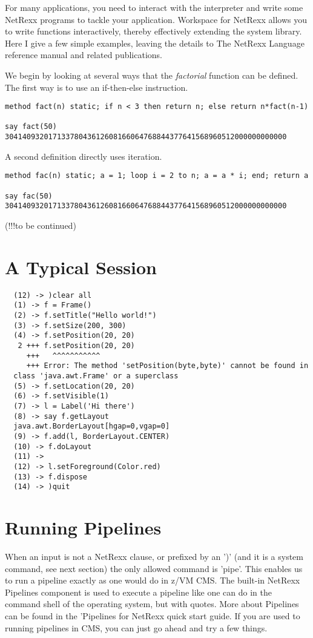 For many applications, you need to interact with the interpreter and write some NetRexx programs to tackle your application. Workspace for NetRexx allows you to write functions interactively, thereby effectively extending the system library. Here I give a few simple examples, leaving the details to The NetRexx Language reference manual and related publications.

We begin by looking at several ways that the \emph{factorial} function can
be defined. The first way is to use an if-then-else instruction.
\begin{verbatim}
method fact(n) static; if n < 3 then return n; else return n*fact(n-1)

say fact(50)
30414093201713378043612608166064768844377641568960512000000000000
\end{verbatim}
A second definition directly uses iteration.
\begin{verbatim}
method fac(n) static; a = 1; loop i = 2 to n; a = a * i; end; return a

say fac(50)
30414093201713378043612608166064768844377641568960512000000000000
\end{verbatim}
(!!!to be continued)

 \section{A Typical Session}
\begin{verbatim}
  (12) -> )clear all
  (1) -> f = Frame()
  (2) -> f.setTitle("Hello world!")
  (3) -> f.setSize(200, 300)
  (4) -> f.setPosition(20, 20)
   2 +++ f.setPosition(20, 20)
     +++   ^^^^^^^^^^^
     +++ Error: The method 'setPosition(byte,byte)' cannot be found in
  class 'java.awt.Frame' or a superclass
  (5) -> f.setLocation(20, 20)
  (6) -> f.setVisible(1)
  (7) -> l = Label('Hi there')
  (8) -> say f.getLayout
  java.awt.BorderLayout[hgap=0,vgap=0]
  (9) -> f.add(l, BorderLayout.CENTER)
  (10) -> f.doLayout
  (11) ->
  (12) -> l.setForeground(Color.red)
  (13) -> f.dispose
  (14) -> )quit
\end{verbatim}

 \section{Running Pipelines}
 When an input is not a NetRexx clause, or prefixed by an ')' (and it is a system command,
 see next section) the only allowed command is 'pipe'. This enables us
 to run a pipeline exactly as one would do in z/VM CMS. The built-in
 NetRexx Pipelines component is used to execute a pipeline like one
 can do in the command shell of the operating system, but with
 quotes. More about Pipelines can be found in the 'Pipelines for
 NetRexx quick start guide. If you are used to running pipelines in
 CMS, you can just go ahead and try a few things.

